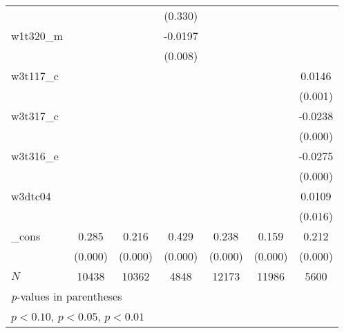 {\begin{tabular}{l*{6}{c}}
            &                     &                     &     (0.330)         &                     &                     &                     \\
[1em]
w1t320\_m    &                     &                     &     -0.0197\sym{***}&                     &                     &                     \\
            &                     &                     &     (0.008)         &                     &                     &                     \\
[1em]
w3t117\_c    &                     &                     &                     &                     &                     &      0.0146\sym{***}\\
            &                     &                     &                     &                     &                     &     (0.001)         \\
[1em]
w3t317\_c    &                     &                     &                     &                     &                     &     -0.0238\sym{***}\\
            &                     &                     &                     &                     &                     &     (0.000)         \\
[1em]
w3t316\_e    &                     &                     &                     &                     &                     &     -0.0275\sym{***}\\
            &                     &                     &                     &                     &                     &     (0.000)         \\
[1em]
w3dtc04     &                     &                     &                     &                     &                     &      0.0109\sym{**} \\
            &                     &                     &                     &                     &                     &     (0.016)         \\
[1em]
\_cons      &       0.285\sym{***}&       0.216\sym{***}&       0.429\sym{***}&       0.238\sym{***}&       0.159\sym{***}&       0.212\sym{***}\\
            &     (0.000)         &     (0.000)         &     (0.000)         &     (0.000)         &     (0.000)         &     (0.000)         \\
\hline
\(N\)       &       10438         &       10362         &        4848         &       12173         &       11986         &        5600         \\
\hline\hline
\multicolumn{7}{l}{\footnotesize \textit{p}-values in parentheses}\\
\multicolumn{7}{l}{\footnotesize \sym{*} \(p<0.10\), \sym{**} \(p<0.05\), \sym{***} \(p<0.01\)}\\
\end{tabular}
}
